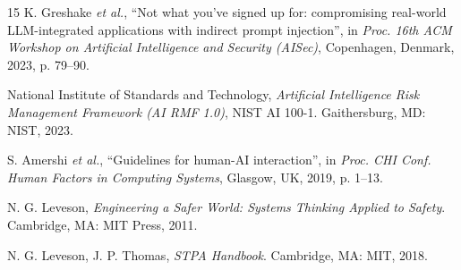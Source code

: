 \documentclass[10pt,a4paper,twocolumn]{article}
\begin{document}
{\begin{thebibliography}{15}
K. Greshake \emph{et al.}, ``Not what you've signed up for: compromising real-world LLM-integrated applications with indirect prompt injection'', in \emph{Proc. 16th ACM Workshop on Artificial Intelligence and Security (AISec)}, Copenhagen, Denmark, 2023, p. 79--90.

National Institute of Standards and Technology, \emph{Artificial Intelligence Risk Management Framework (AI RMF 1.0)}, NIST AI 100-1. Gaithersburg, MD: NIST, 2023.

S. Amershi \emph{et al.}, ``Guidelines for human-AI interaction'', in \emph{Proc. CHI Conf. Human Factors in Computing Systems}, Glasgow, UK, 2019, p. 1--13.

N. G. Leveson, \emph{Engineering a Safer World: Systems Thinking Applied to Safety}. Cambridge, MA: MIT Press, 2011.

N. G. Leveson, J. P. Thomas, \emph{STPA Handbook}. Cambridge, MA: MIT, 2018.

\end{thebibliography}}
\end{document}
